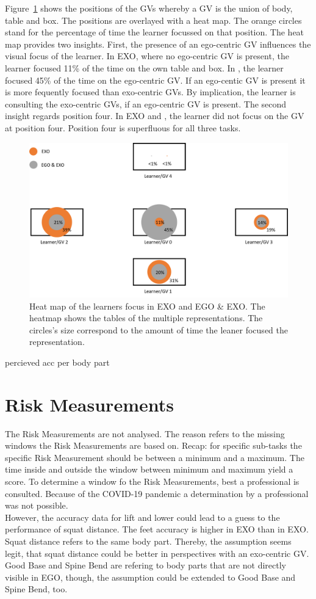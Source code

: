 Figure~\ref{fig:posHeatMap} shows the positions of the GVs whereby a GV is the union of body, table and box. The positions are overlayed with a heat map. The orange circles stand for the percentage of time the learner focussed on that position. The heat map provides two insights. First, the presence of an ego-centric GV influences the visual focus of the learner. In EXO, where no ego-centric GV is present, the learner focused 11\% of the time on the own table and box. In \combi, the learner focused 45\% of the time on the ego-centric GV. If an ego-centic GV is present it is more fequently focused than exo-centric GVs. By implication, the learner is consulting the exo-centric GVs, if an ego-centric GV is present.
The second insight regards position four. In EXO and \combi, the learner did not focus on the GV at position four. Position four is superfluous for all three tasks.
\begin{figure}[htb]
	\centering
	\includegraphics[width=\textwidth]{figures/positionHeatMap.png}
	\caption[Looking At heat map.]{Heat map of the learners focus in EXO and EGO \& EXO. The heatmap shows the tables of the multiple representations. The circles's size correspond to the amount of time the leaner focused the representation.}
	\label{fig:posHeatMap}
\end{figure}
percieved acc per body part

\section{Risk Measurements}
The Risk Measurements are not analysed. The reason refers to the missing windows the Risk Measurements are based on. Recap: for specific sub-tasks the specific Risk Measurement should be between a minimum and a maximum. The time inside and outside the window between minimum and maximum yield a score. To determine a window fo the Risk Measurements, best a professional is consulted. Because of the COVID-19 pandemic a determination by a professional was not possible.\\
However, the accuracy data for lift and lower could lead to a guess to the performance of squat distance. The feet accuracy is higher in EXO than in EXO. Squat distance refers to the same body part. Thereby, the assumption seems legit, that squat distance could be better in perspectives with an exo-centric GV. Good Base and Spine Bend are refering to body parts that are not directly visible in EGO, though, the assumption could be extended to Good Base and Spine Bend, too.


